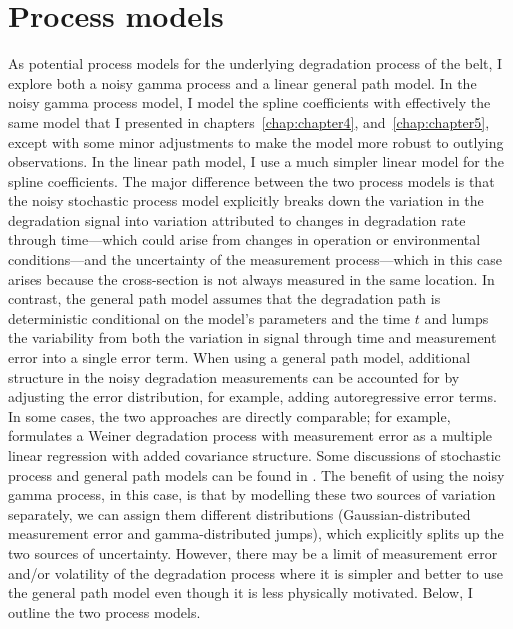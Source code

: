 \section{Process models} \label{sec:belt-wear-process}
As potential process models for the underlying degradation process of the belt, I explore both a noisy gamma process and a linear general path model. In the noisy gamma process model, I model the spline coefficients with effectively the same model that I presented in chapters~\ref{chap:chapter4}, and~\ref{chap:chapter5}, except with some minor adjustments to make the model more robust to outlying observations. In the linear path model, I use a much simpler linear model for the spline coefficients. The major difference between the two process models is that the noisy stochastic process model explicitly breaks down the variation in the degradation signal into variation attributed to changes in degradation rate through time---which could arise from changes in operation or environmental conditions---and the uncertainty of the measurement process---which in this case arises because the cross-section is not always measured in the same location. In contrast, the general path model assumes that the degradation path is deterministic conditional on the model's parameters and the time $t$ and lumps the variability from both the variation in signal through time and measurement error into a single error term. When using a general path model, additional structure in the noisy degradation measurements can be accounted for by adjusting the error distribution, for example, adding autoregressive error terms. In some cases, the two approaches are directly comparable; for example, \citet{whitmore_1995} formulates a Weiner degradation process with measurement error as a multiple linear regression with added covariance structure. Some discussions of stochastic process and general path models can be found in \citet{ye2015}. The benefit of using the noisy gamma process, in this case, is that by modelling these two sources of variation separately, we can assign them different distributions (Gaussian-distributed measurement error and gamma-distributed jumps), which explicitly splits up the two sources of uncertainty. However, there may be a limit of measurement error and/or volatility of the degradation process where it is simpler and better to use the general path model even though it is less physically motivated. Below, I outline the two process models.

